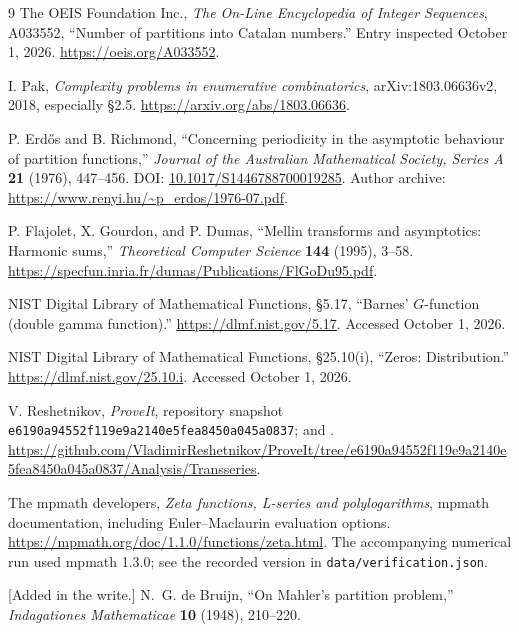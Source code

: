 \documentclass[11pt,a4paper]{article}
\numberwithin{equation}{section}
\theoremstyle{definition}
\theoremstyle{remark}
\begin{document}
\begin{thebibliography}{9}
The OEIS Foundation Inc., \emph{The On-Line Encyclopedia of Integer
Sequences}, A033552, ``Number of partitions into Catalan numbers.''
Entry inspected October 1, 2026. \url{https://oeis.org/A033552}.

I. Pak, \emph{Complexity problems in enumerative combinatorics},
arXiv:1803.06636v2, 2018, especially \S2.5.
\url{https://arxiv.org/abs/1803.06636}.

P. Erd\H{o}s and B. Richmond,
``Concerning periodicity in the asymptotic behaviour of partition functions,''
\emph{Journal of the Australian Mathematical Society, Series A}
\textbf{21} (1976), 447--456.
DOI: \href{https://doi.org/10.1017/S1446788700019285}{10.1017/S1446788700019285}.
Author archive: \url{https://www.renyi.hu/~p_erdos/1976-07.pdf}.

P. Flajolet, X. Gourdon, and P. Dumas,
``Mellin transforms and asymptotics: Harmonic sums,''
\emph{Theoretical Computer Science} \textbf{144} (1995), 3--58.
\url{https://specfun.inria.fr/dumas/Publications/FlGoDu95.pdf}.

NIST Digital Library of Mathematical Functions, \S5.17,
``Barnes' $G$-function (double gamma function).''
\url{https://dlmf.nist.gov/5.17}. Accessed October 1, 2026.

NIST Digital Library of Mathematical Functions, \S25.10(i),
``Zeros: Distribution.''
\url{https://dlmf.nist.gov/25.10.i}. Accessed October 1, 2026.

V. Reshetnikov, \emph{ProveIt}, repository snapshot
\texttt{e6190a94552f119e9a2140e5fea8450a045a0837};
 and
.
\url{https://github.com/VladimirReshetnikov/ProveIt/tree/e6190a94552f119e9a2140e5fea8450a045a0837/Analysis/Transseries}.

The mpmath developers, \emph{Zeta functions, L-series and polylogarithms},
mpmath documentation, including Euler--Maclaurin evaluation options.
\url{https://mpmath.org/doc/1.1.0/functions/zeta.html}.
The accompanying numerical run used mpmath 1.3.0; see the recorded
version in \texttt{data/verification.json}.

[Added in the write.] N.~G. de Bruijn, ``On Mahler's partition
problem,'' \emph{Indagationes Mathematicae} \textbf{10} (1948),
210--220.


\end{thebibliography}
\end{document}
